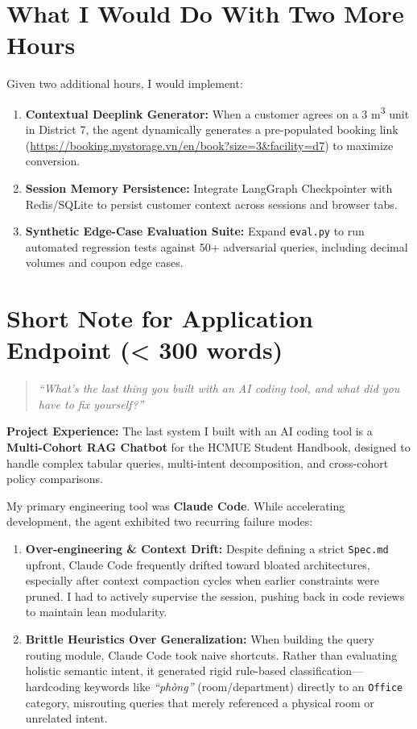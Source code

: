 \documentclass[10pt,a4paper]{article}
\begin{document}
\section{What I Would Do With Two More Hours}

Given two additional hours, I would implement:
\begin{enumerate}
  \item \textbf{Contextual Deeplink Generator:} When a customer agrees on a 3 m\textsuperscript{3} unit in District 7, the agent dynamically generates a pre-populated booking link (\url{https://booking.mystorage.vn/en/book?size=3&facility=d7}) to maximize conversion.
  \item \textbf{Session Memory Persistence:} Integrate LangGraph Checkpointer with Redis/SQLite to persist customer context across sessions and browser tabs.
  \item \textbf{Synthetic Edge-Case Evaluation Suite:} Expand \texttt{eval.py} to run automated regression tests against 50+ adversarial queries, including decimal volumes and coupon edge cases.
\end{enumerate}

\section{Short Note for Application Endpoint (\textless{} 300 words)}

\begin{quote}
\footnotesize\itshape
``What's the last thing you built with an AI coding tool, and what did you have to fix yourself?''
\end{quote}

\textbf{Project Experience:} The last system I built with an AI coding tool is a \textbf{Multi-Cohort RAG Chatbot} for the HCMUE Student Handbook, designed to handle complex tabular queries, multi-intent decomposition, and cross-cohort policy comparisons.

My primary engineering tool was \textbf{Claude Code}. While accelerating development, the agent exhibited two recurring failure modes:
\begin{enumerate}
  \item \textbf{Over-engineering \& Context Drift:} Despite defining a strict \texttt{Spec.md} upfront, Claude Code frequently drifted toward bloated architectures, especially after context compaction cycles when earlier constraints were pruned. I had to actively supervise the session, pushing back in code reviews to maintain lean modularity.
  \item \textbf{Brittle Heuristics Over Generalization:} When building the query routing module, Claude Code took naive shortcuts. Rather than evaluating holistic semantic intent, it generated rigid rule-based classification---hardcoding keywords like \textit{``ph\`ong''} (room/department) directly to an \texttt{Office} category, misrouting queries that merely referenced a physical room or unrelated intent.
\end{enumerate}
\end{document}
